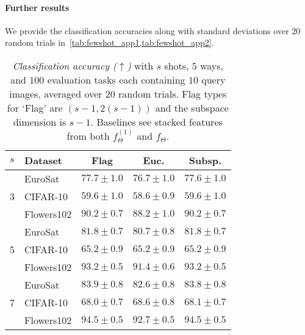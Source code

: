 \paragraph{Further results}
We provide the classification accuracies along with standard deviations over $20$ random trials in~\cref{tab:fewshot_app1,tab:fewshot_app2}. 
\setlength{\tabcolsep}{10pt}
\begin{table}[ht]
    \centering
    \caption{\emph{Classification accuracy ($\uparrow$)} with $s$ shots, $5$ ways, and $100$ evaluation tasks each containing $10$ query images, averaged over $20$ random trials. Flag types for `Flag' are $(s-1,2(s-1))$ and the subspace dimension is $s-1$. Baselines see stacked features from both $f^{(1)}_\Theta$ and $f_\Theta$.}
    \label{tab:fewshot_app1}
    \begin{tabular}{@{\hskip 4pt}l@{\hskip 4pt}l@{\hskip 4pt}c@{\hskip 7pt} c @{\hskip 7pt}c}
    \toprule
    $s$ & Dataset & Flag & Euc. & Subsp. \\
    \midrule
    \multirow[t]{3}{*}{3} & EuroSat & $\bm{77.7} \pm 1.0$ & $76.7 \pm 1.0$ & $77.6 \pm 1.0$ \\
     & CIFAR-10 & $\bm{59.6} \pm 1.0$ & $58.6 \pm 0.9$ & $\bm{59.6} \pm 1.0$ \\
     & Flowers102 & $\bm{90.2} \pm 0.7$ & $88.2 \pm 1.0$ & $\bm{90.2} \pm 0.7$ \\
    \cline{1-5}
    \multirow[t]{3}{*}{5} & EuroSat & $\bm{81.8} \pm 0.7$ & $80.7 \pm 0.8$ & $\bm{81.8} \pm 0.7$ \\
     & CIFAR-10 & $\bm{65.2} \pm 0.9$ & $\bm{65.2} \pm 0.9$ & $\bm{65.2} \pm 0.9$ \\
     & Flowers102 & $\bm{93.2} \pm 0.5$ & $91.4 \pm 0.6$ & $\bm{93.2} \pm 0.5$ \\
    \cline{1-5}
    \multirow[t]{3}{*}{7} & EuroSat & $\bm{83.9} \pm 0.8$ & $82.6 \pm 0.8$ & $83.8 \pm 0.8$ \\
     & CIFAR-10 & $68.0 \pm 0.7$ & $\bm{68.6} \pm 0.8$ & $68.1 \pm 0.7$ \\
     & Flowers102 & $\bm{94.5} \pm 0.5$ & $92.7 \pm 0.5$ & $\bm{94.5} \pm 0.5$ \\
    \bottomrule
    \end{tabular}
\end{table}

